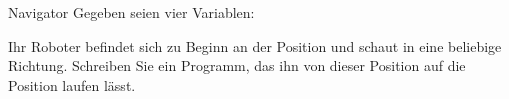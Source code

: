 \documentclass{../tuda-exercise}
\begin{document}
  \begin{task}[credit=\stars{3}{3}]{Navigator}
    Gegeben seien vier Variablen:

    \begin{minipage}{0.475\textwidth}
      \begin{flushright}

        \br

      \end{flushright}
    \end{minipage}
    \hfill
    \begin{minipage}{0.475\textwidth}

      \br

    \end{minipage}

    \br

    Ihr Roboter befindet sich zu Beginn an der Position  und schaut
    in eine beliebige Richtung. Schreiben Sie ein Programm, das ihn von dieser Position auf die
    Position  laufen lässt.

    \begin{solution}
      
    \end{solution}
  \end{task}
\end{document}
